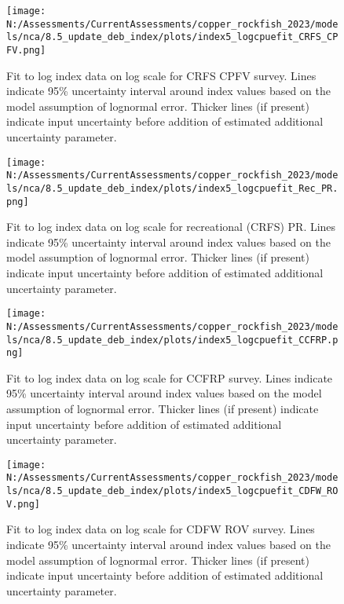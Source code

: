 \documentclass[11pt,
  english,
  letterpaper,
]{article}
\begin{document}
\begin{figure}
\centering
\texttt{[image: N:/Assessments/CurrentAssessments/copper\_rockfish\_2023/models/nca/8.5\_update\_deb\_index/plots/index5\_logcpuefit\_CRFS\_CPFV.png]}
\caption{Fit to log index data on log scale for CRFS CPFV survey. Lines indicate 95\% uncertainty interval around index values based on the model assumption of lognormal error. Thicker lines (if present) indicate input uncertainty before addition of estimated additional uncertainty parameter.\label{fig:crfs-cpfv-index-fit}}
\end{figure}

\begin{figure}
\centering
\texttt{[image: N:/Assessments/CurrentAssessments/copper\_rockfish\_2023/models/nca/8.5\_update\_deb\_index/plots/index5\_logcpuefit\_Rec\_PR.png]}
\caption{Fit to log index data on log scale for recreational (CRFS) PR. Lines indicate 95\% uncertainty interval around index values based on the model assumption of lognormal error. Thicker lines (if present) indicate input uncertainty before addition of estimated additional uncertainty parameter.\label{fig:crfs-pr-index-fit}}
\end{figure}

\begin{figure}
\centering
\texttt{[image: N:/Assessments/CurrentAssessments/copper\_rockfish\_2023/models/nca/8.5\_update\_deb\_index/plots/index5\_logcpuefit\_CCFRP.png]}
\caption{Fit to log index data on log scale for CCFRP survey. Lines indicate 95\% uncertainty interval around index values based on the model assumption of lognormal error. Thicker lines (if present) indicate input uncertainty before addition of estimated additional uncertainty parameter.\label{fig:ccfrp-index-fit}}
\end{figure}

\begin{figure}
\centering
\texttt{[image: N:/Assessments/CurrentAssessments/copper\_rockfish\_2023/models/nca/8.5\_update\_deb\_index/plots/index5\_logcpuefit\_CDFW\_ROV.png]}
\caption{Fit to log index data on log scale for CDFW ROV survey. Lines indicate 95\% uncertainty interval around index values based on the model assumption of lognormal error. Thicker lines (if present) indicate input uncertainty before addition of estimated additional uncertainty parameter.\label{fig:rov-index-fit}}
\end{figure}
\end{document}
